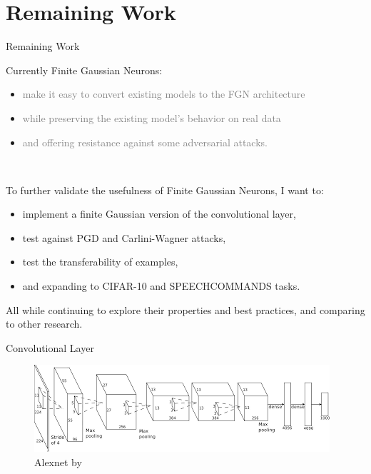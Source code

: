 \documentclass{beamer}
\begin{document}
\section{Remaining Work}
\begin{frame}{Remaining Work}

    Currently Finite Gaussian Neurons:
    \begin{itemize}
        \item \textcolor{gray}{make it easy to convert existing models to the FGN architecture}
        \item \textcolor{gray}{while preserving the existing model's behavior on real data}
        \item \textcolor{gray}{and offering resistance against some adversarial attacks.} 
    \end{itemize}
    ~

    To further validate the usefulness of Finite Gaussian Neurons, I want to:
    \begin{itemize}
        \item implement a finite Gaussian version of the convolutional layer,
        \item test against PGD and Carlini-Wagner attacks,
        \item test the transferability of examples,
        \item and expanding to CIFAR-10 and SPEECHCOMMANDS tasks.
    \end{itemize}
    All while continuing to explore their properties and best practices, and comparing to other research.
\end{frame}

\begin{frame}{Convolutional Layer}
\begin{figure}
    \centering
    \includegraphics[width=.85\textwidth]{images/image net.png}
    \caption*{Alexnet by \cite{krizhevsky2012imagenet} }
\end{figure}
\end{frame}
\end{document}
